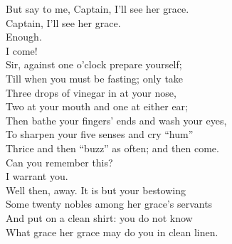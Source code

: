 \documentclass[a4paper,oneside,12pt]{memoir}
\begin{document}
\begin{drama*}
But say to me, Captain, I'll see her grace.\\
\dapperspeaks Captain, I'll see her grace.\\
\facespeaks {} Enough.\\
\subtlespeaks {} I come!\\
Sir, against one o'clock prepare yourself;\\
Till when you must be fasting; only take\\
Three drops of vinegar in at your nose,\\
Two at your mouth and one at either ear;\\
Then bathe your fingers' ends and wash your eyes,\\
To sharpen your five senses and cry ``hum''\\
Thrice and then ``buzz'' as often; and then come.\\
\facespeaks Can you remember this?\\
\dapperspeaks {} I warrant you.\\
\facespeaks Well then, away. It is but your bestowing\\
Some twenty nobles among her grace's servants\\
And put on a clean shirt: you do not know\\
What grace her grace may do you in clean linen.\\

\scene


\end{drama*}
\end{document}

